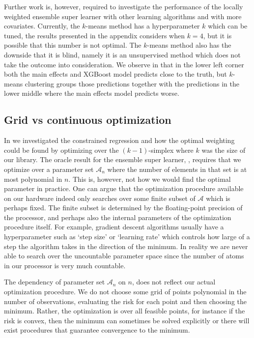 \documentclass[11pt, a4paper]{article}
\theoremstyle{definition}
\theoremstyle{remark}
\newcommand{\ml}{k}
\begin{document}
Further work is, however, required to investigate the performance of the locally weighted ensemble super learner with other learning algorithms and with more covariates. Currently, the $ k $-means method has a hyperparameter $ k $ which can be tuned, the results presented in the appendix considers when $ k = 4 $, but it is possible that this number is not optimal. The $ k $-means method also has the downside that it is blind, namely it is an unsupervised method which does not take the outcome into consideration. We observe in  that in the lower left corner both the main effects and XGBoost model predicts close to the truth, but $ k $-means clustering groups those predictions together with the predictions in the lower middle where the main effects model predicts worse. 

\subsection{Grid vs continuous optimization} 
In  we investigated the constrained regression and how the optimal weighting could be found by optimizing over the $ (\ml -1) $-simplex where $ \ml $ was the size of our library. The oracle result for the ensemble super learner, , requires that we optimize over a parameter set $ \mathcal{A}_n $ where the number of elements in that set is at most polynomial in $ n $. This is, however, not how we would find the optimal parameter in practice. One can argue that the optimization procedure available on our hardware indeed only searches over some finite subset of $ \mathcal{A} $ which is perhaps fixed. The finite subset is determined by the floating-point precision of the processor, and perhaps also the internal parameters of the optimization procedure itself. For example, gradient descent algorithms usually have a hyperparameter such as `step size' or `learning rate' which controls how large of a step the algorithm takes in the direction of the minimum. In reality we are never able to search over the uncountable parameter space since the number of atoms in our processor is very much countable. 

The dependency of parameter set $ \mathcal{A}_n $ on $ n $, does not reflect our actual optimization procedure. We do not choose some grid of points polynomial in the number of observations, evaluating the risk for each point and then choosing the minimum. Rather, the optimization is over all feasible points, for instance if the risk is convex, then the minimum can sometimes be solved explicitly or there will exist procedures that guarantee convergence to the minimum. 
\end{document}
